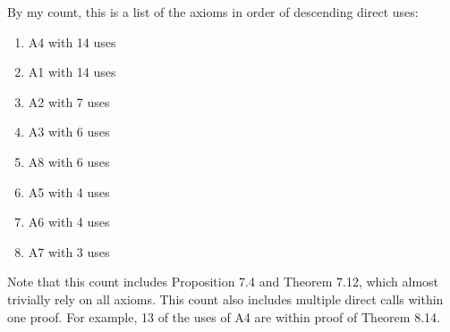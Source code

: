 \documentclass[11pt]{hmcpset}
\begin{document}
By my count, this is a list of the axioms in order of descending direct uses:
\begin{enumerate}
\item{A4 with 14 uses}
\item{A1 with 14 uses}
\item{A2 with 7 uses}
\item{A3 with 6 uses}
\item{A8 with 6 uses}
\item{A5 with 4 uses}
\item{A6 with 4 uses}
\item{A7 with 3 uses}
\end{enumerate}

Note that this count includes Proposition 7.4 and Theorem 7.12, which almost trivially rely on all axioms. This count also includes multiple direct calls within one proof. For example, 13 of the uses of A4 are within proof of Theorem 8.14.
\end{document}
